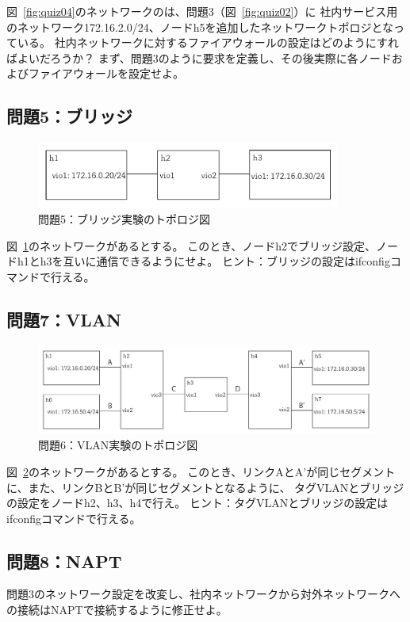 図~\ref{fig:quiz04}のネットワークのは、問題3（図~\ref{fig:quiz02}）に
社内サービス用のネットワーク172.16.2.0/24、ノードh5を追加したネットワークトポロジとなっている。
社内ネットワークに対するファイアウォールの設定はどのようにすればよいだろうか？
まず、問題3のように要求を定義し、その後実際に各ノードおよびファイアウォールを設定せよ。

\subsection{問題5：ブリッジ}

\begin{figure}
    \centering
    \includegraphics[width=10cm,pagebox=artbox]{figs/quiz05.pdf}
    \caption{問題5：ブリッジ実験のトポロジ図} \label{fig:quiz05}
\end{figure}

図~\ref{fig:quiz05}のネットワークがあるとする。
このとき、ノードh2でブリッジ設定、ノードh1とh3を互いに通信できるようにせよ。
ヒント：ブリッジの設定はifconfigコマンドで行える。

\subsection{問題7：VLAN}

\begin{figure}
    \centering
    \includegraphics[width=15cm,pagebox=artbox]{figs/quiz06.pdf}
    \caption{問題6：VLAN実験のトポロジ図} \label{fig:quiz06}
\end{figure}

図~\ref{fig:quiz06}のネットワークがあるとする。
このとき、リンクAとA'が同じセグメントに、また、リンクBとB'が同じセグメントとなるように、
タグVLANとブリッジの設定をノードh2、h3、h4で行え。
ヒント：タグVLANとブリッジの設定はifconfigコマンドで行える。

\subsection{問題8：NAPT}

問題3のネットワーク設定を改変し、社内ネットワークから対外ネットワークへの接続はNAPTで接続するように修正せよ。